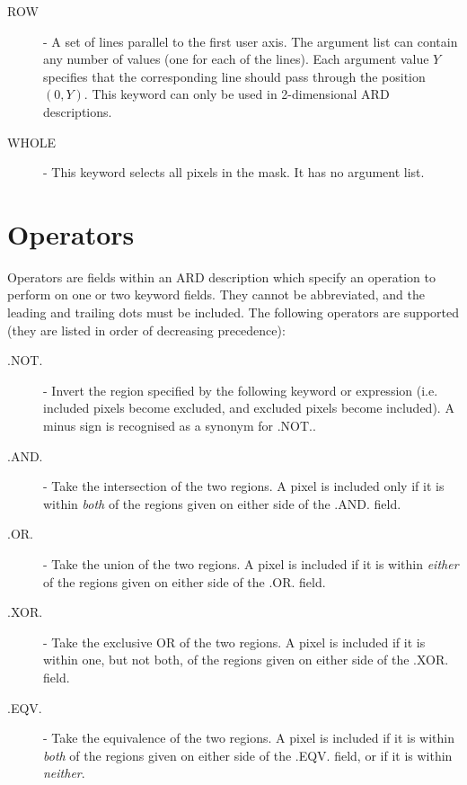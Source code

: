 \documentclass[11pt]{starlink}
\begin{document}
\begin{description}
\item [\label{KEY:ROW}ROW] - A set of lines parallel to the first user axis.
The argument list can contain any number of values (one for each of the
lines). Each argument value $Y$ specifies that the corresponding line
should pass through the position $(0,Y)$. This keyword can only be used
in 2-dimensional ARD descriptions.

\item [\label{KEY:WHO}WHOLE] - This keyword selects all pixels in the mask. It
has no argument list.

\end{description}

\section{\label{SEC:OPER}Operators}
Operators are fields within an ARD description which specify an operation to
perform on one or two keyword fields. They cannot be abbreviated, and the
leading and trailing dots must be included. The following operators are
supported (they are listed in order of decreasing precedence):

\begin{description}

\item [\label{OP:NOT}.NOT.] - Invert the region specified by the following keyword or
expression (i.e. included pixels become excluded, and excluded pixels become
included). A minus sign is recognised as a synonym for .NOT..

\item [\label{OP:AND}.AND.] - Take the intersection of the two regions. A pixel is included
only if it is within \emph{both} of the regions given on either side of the
.AND. field.

\item [\label{OP:OR}.OR.] - Take the union of the two regions. A pixel is included if it is
within \emph{either} of the regions given on either side of the .OR. field.

\item [\label{OP:XOR}.XOR.] - Take the exclusive OR of the two regions. A pixel is included if
it is within one, but not both, of the regions given on either side of the .XOR.
field.

\item [\label{OP:EQV}.EQV.] - Take the equivalence of the two regions. A pixel is included if
it is within \emph{both} of the regions given on either side of the .EQV. field,
or if it is within \emph{neither}.

\end{description}
\end{document}
